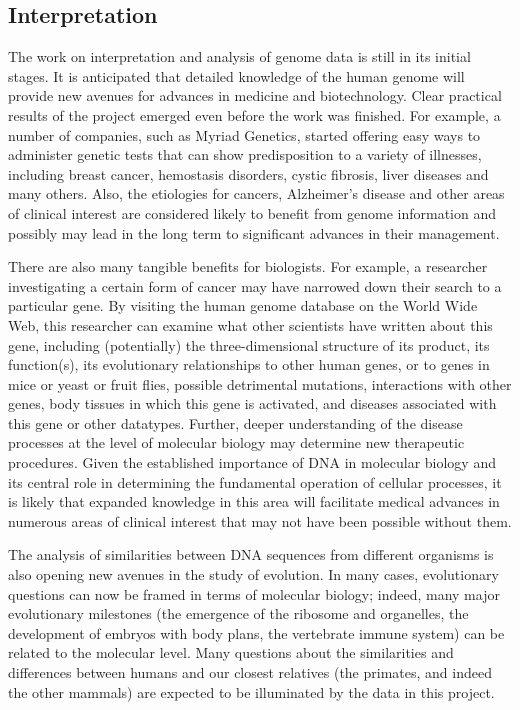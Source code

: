 \documentclass[12pt]{article}
\begin{document}
\subsection{Interpretation}
The work on interpretation and analysis of genome data is still in its initial stages. It is anticipated that detailed knowledge of the human genome will provide new avenues for advances in medicine and biotechnology. Clear practical results of the project emerged even before the work was finished. For example, a number of companies, such as Myriad Genetics, started offering easy ways to administer genetic tests that can show predisposition to a variety of illnesses, including breast cancer, hemostasis disorders, cystic fibrosis, liver diseases and many others. Also, the etiologies for cancers, Alzheimer's disease and other areas of clinical interest are considered likely to benefit from genome information and possibly may lead in the long term to significant advances in their management.

There are also many tangible benefits for biologists. For example, a researcher investigating a certain form of cancer may have narrowed down their search to a particular gene. By visiting the human genome database on the World Wide Web, this researcher can examine what other scientists have written about this gene, including (potentially) the three-dimensional structure of its product, its function(s), its evolutionary relationships to other human genes, or to genes in mice or yeast or fruit flies, possible detrimental mutations, interactions with other genes, body tissues in which this gene is activated, and diseases associated with this gene or other datatypes. Further, deeper understanding of the disease processes at the level of molecular biology may determine new therapeutic procedures. Given the established importance of DNA in molecular biology and its central role in determining the fundamental operation of cellular processes, it is likely that expanded knowledge in this area will facilitate medical advances in numerous areas of clinical interest that may not have been possible without them.

The analysis of similarities between DNA sequences from different organisms is also opening new avenues in the study of evolution. In many cases, evolutionary questions can now be framed in terms of molecular biology; indeed, many major evolutionary milestones (the emergence of the ribosome and organelles, the development of embryos with body plans, the vertebrate immune system) can be related to the molecular level. Many questions about the similarities and differences between humans and our closest relatives (the primates, and indeed the other mammals) are expected to be illuminated by the data in this project.
\end{document}

